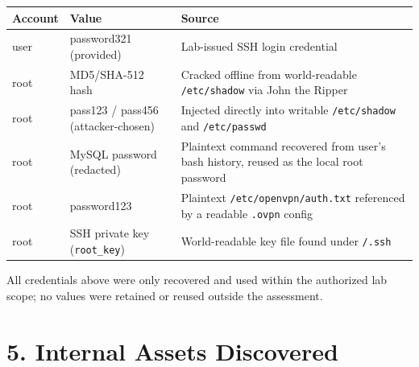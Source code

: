 \documentclass[11pt]{article}
\begin{document}
\begin{center}
\begin{tabular}{L{3cm}L{3.6cm}L{6.5cm}}
\toprule
\textbf{Account} & \textbf{Value} & \textbf{Source} \\
\midrule
user & password321 (provided) & Lab-issued SSH login credential \\
root & MD5/SHA-512 hash & Cracked offline from world-readable \texttt{/etc/shadow} via John the Ripper \\
root & pass123 / pass456 (attacker-chosen) & Injected directly into writable \texttt{/etc/shadow} and \texttt{/etc/passwd} \\
root & MySQL password (redacted) & Plaintext command recovered from user's bash history, reused as the local root password \\
root & password123 & Plaintext \texttt{/etc/openvpn/auth.txt} referenced by a readable \texttt{.ovpn} config \\
root & SSH private key (\texttt{root\_key}) & World-readable key file found under \texttt{/.ssh} \\
\bottomrule
\end{tabular}
\end{center}

All credentials above were only recovered and used within the authorized lab scope; no values were
retained or reused outside the assessment.

\section{5. Internal Assets Discovered}
\end{document}
